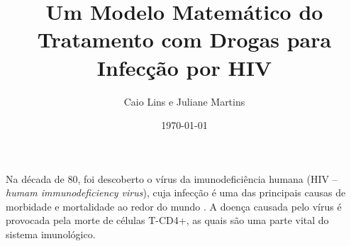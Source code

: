 \documentclass[a4paper, 12pt]{article}
\title{Um Modelo Matemático do Tratamento com Drogas para Infecção por HIV}
\author{Caio Lins e Juliane Martins}
\date{\today}
\begin{document}
\maketitle







Na década de 80, foi descoberto o vírus da imunodeficiência humana (HIV -- \textit{humam immunodeficiency virus}), cuja infecção é uma das principais causas de morbidade e mortalidade ao redor do mundo \cite{nature}.
A doença causada pelo vírus é provocada pela morte de células T-CD4+, as quais são uma parte vital do sistema imunológico.

\printbibliography
\end{document}
